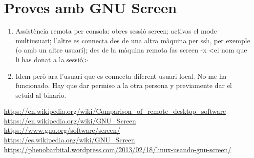 \documentclass[a4paper]{article}
\begin{document}

\section{Proves amb GNU Screen}

\begin{enumerate}
	\item Assistència remota per consola: obres sessió screen; activas el mode multiusuari; l'altre es connecta des de una altra màquina per ssh, per exemple (o amb un altre usuari); des de la màquina remota fas screen -x <el nom que li has donat a la sessió>
	\item Idem però ara l'usuari que es connecta  diferent usuari local. No me ha funcionado. Hay que dar permiso a la otra persona y previamente dar el setuid al binario.
\end{enumerate}

\begin{thebibliography}{99}
	 
	 \url{https://en.wikipedia.org/wiki/Comparison_of_remote_desktop_software}
	 \url{https://en.wikipedia.org/wiki/GNU_Screen} 
	 \url{https://www.gnu.org/software/screen/}
	 \url{https://es.wikipedia.org/wiki/GNU_Screen}
	 \url{https://phenobarbital.wordpress.com/2013/02/18/linux-usando-gnu-screen/}
\end{thebibliography}
\end{document}
